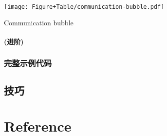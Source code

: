 \documentclass[
]{article}
\newenvironment{Shaded}{\begin{snugshade}}{\end{snugshade}}
\newcommand{\CommentTok}[1]{\textcolor[rgb]{0.56,0.35,0.01}{\textit{#1}}}
\newcommand{\NormalTok}[1]{#1}
\newcommand{\OperatorTok}[1]{\textcolor[rgb]{0.81,0.36,0.00}{\textbf{#1}}}
\begin{document}
\begin{Shaded}
\end{Shaded}

\def\@captype{figure}
\begin{center}
\texttt{[image: Figure+Table/communication-bubble.pdf]}
\caption{Communication bubble}\label{fig:communication-bubble}
\end{center}

\hypertarget{ux8fdbux9636}{%
\paragraph{(进阶)}\label{ux8fdbux9636}}

\hypertarget{ux5b8cux6574ux793aux4f8bux4ee3ux7801}{%
\subsubsection{完整示例代码}\label{ux5b8cux6574ux793aux4f8bux4ee3ux7801}}

\hypertarget{ux6280ux5de7}{%
\subsection{技巧}\label{ux6280ux5de7}}

\hypertarget{bibliography}{%
\section*{Reference}\label{bibliography}}
\end{document}
